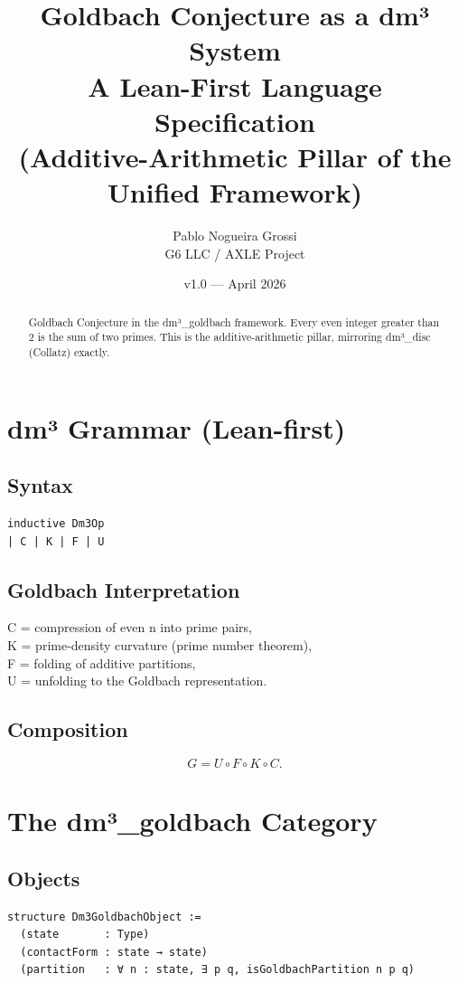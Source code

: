 \documentclass[11pt,a4paper]{article}
\title{\textbf{Goldbach Conjecture as a dm³ System}\\
A Lean-First Language Specification \\
(Additive-Arithmetic Pillar of the Unified Framework)}
\author{Pablo Nogueira Grossi \\ G6 LLC / AXLE Project}
\date{v1.0 — April 2026}
\begin{document}
\maketitle

\begin{abstract}
Goldbach Conjecture in the dm³\_goldbach framework.
Every even integer greater than 2 is the sum of two primes.
This is the additive-arithmetic pillar, mirroring dm³\_disc (Collatz) exactly.
\end{abstract}

\section{dm³ Grammar (Lean-first)}

\subsection{Syntax}
\begin{lstlisting}
inductive Dm3Op
| C | K | F | U
\end{lstlisting}

\subsection{Goldbach Interpretation}
C = compression of even n into prime pairs, \\
K = prime-density curvature (prime number theorem), \\
F = folding of additive partitions, \\
U = unfolding to the Goldbach representation.

\subsection{Composition}
\[
G = U \circ F \circ K \circ C.
\]

\section{The dm³\_goldbach Category}

\subsection{Objects}
\begin{lstlisting}
structure Dm3GoldbachObject :=
  (state       : Type)
  (contactForm : state → state)
  (partition   : ∀ n : state, ∃ p q, isGoldbachPartition n p q)
\end{lstlisting}
\end{document}
